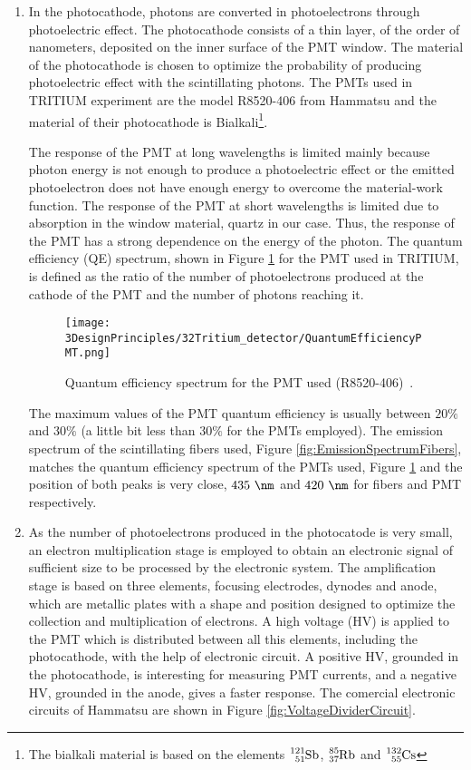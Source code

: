 \begin{enumerate}
\item{} In the photocathode, photons are converted in photoelectrons through photoelectric effect. The photocathode consists of a thin layer, of the order of nanometers, deposited on the inner surface of the PMT window. The material of the photocathode is chosen to optimize the probability of producing photoelectric effect with the scintillating photons. The PMTs used in TRITIUM experiment are the model R8520-406 from Hammatsu \cite{DataSheetPMTs} and the material of their photocathode is Bialkali\footnote{The bialkali material is based on the elements $\ce{^{121}_{51}Sb}$, $\ce{^{85}_{37}Rb}$ and $\ce{^{132}_{55}Cs}$}.

The response of the PMT at long wavelengths is limited mainly because photon energy is not enough to produce a photoelectric effect or the emitted photoelectron does not have enough energy to overcome the material-work function. The response of the PMT at short wavelengths is limited due to absorption in the window material, quartz in our case. Thus, the response of the PMT has a strong dependence on the energy of the photon. The quantum efficiency (QE)  spectrum, shown in Figure \ref{fig:QuantumEfficiencyPMT} for the PMT used in TRITIUM, is defined as the ratio of the number of photoelectrons produced at the cathode of the PMT and the number of photons reaching it.

\begin{figure}[htbp]
\centering
\texttt{[image: 3DesignPrinciples/32Tritium\_detector/QuantumEfficiencyPMT.png]}
\caption{Quantum efficiency spectrum for the PMT used (R8520-406)\label{fig:QuantumEfficiencyPMT}~\cite{DataSheetPMTs}.}
\end{figure}

The maximum values of the PMT quantum efficiency is usually between $20\%$ and $30\%$ \cite{Knoll} (a little bit less than $30\%$ for the PMTs employed). The emission spectrum of the scintillating fibers used, Figure \ref{fig:EmissionSpectrumFibers}, matches the quantum efficiency spectrum of the PMTs used, Figure \ref{fig:QuantumEfficiencyPMT} and the position of both peaks is very close, $435~\nm$ and $420~\nm$ for fibers and PMT respectively.

\item{} As the number of photoelectrons produced in the photocatode is very small, an electron multiplication stage is employed to obtain an electronic signal of sufficient size to be processed by the electronic system. The amplification stage is based on three elements, focusing electrodes, dynodes and anode, which are metallic plates with a shape and position designed to optimize the collection and multiplication of electrons. A high voltage (HV) is applied to the PMT which is distributed between all this elements, including the photocathode, with the help of electronic circuit. A positive HV, grounded in the photocathode, is interesting for measuring PMT currents, and a negative HV, grounded in the anode, gives a faster response. The comercial electronic circuits of Hammatsu are shown in Figure \ref{fig:VoltageDividerCircuit}.


\end{enumerate}
